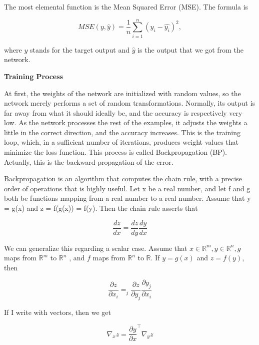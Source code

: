 The most elemental function is the Mean Squared Error (MSE).
The formula is

\begin{equation}
    MSE(y,\hat{y}) = \frac{1}{n} \sum_{i=1}^{n} (y_i - \hat{y_i})^2 ,\label{eq:equation2}
\end{equation}

where $y$ stands for the target output and $\hat{y}$ is the output that we got from the network.

{\large \textbf{Training Process}}

At first, the weights of the network are initialized with random values, so the network merely
performs a set of random transformations.
Normally, its output is far away from what it should ideally be, and the accuracy is respectively very low.
As the network processes the rest of the examples, it adjusts the weights a little in the correct
direction, and the accuracy increases.
This is the training loop, which, in a sufficient number of iterations, produces weight values that
minimize the loss function.
This process is called Backpropagation (BP).
Actually, this is the backward propagation of the error.

Backpropagation is an algorithm that computes the chain rule, with a precise order of operations that is highly useful.
Let x be a real number, and let f and g both be functions mapping from a real number to a real number.
Assume that y = g(x) and z = f(g(x)) = f(y).
Then the chain rule asserts that

\begin{equation}
    \frac{dz}{dx} = \frac{dz}{dy} \frac{dy}{dx}\label{eq:equation3}
\end{equation}

We can generalize this regarding a scalar case.
Assume that $x \in \mathbb{R}^m , y \in \mathbb{R}^n , g $ maps from $\mathbb{R}^m$ to $\mathbb{R}^n$ , and $f$ maps
from $\mathbb{R}^n$ to $\mathbb{R}$.
If $y = g(x)$ and $z = f(y)$, then

\begin{equation}
    \frac{\partial z}{\partial x_i} = _{j}^{} \frac{\partial z}{\partial y_j} \frac{\partial y_j}{\partial x_i}\label{eq:equation4}
\end{equation}

If I write with vectors, then we get

\begin{equation}
    \nabla_x z = \frac{\partial y}{\partial x}^\top \nabla_y z\label{eq:equation5}
\end{equation}

